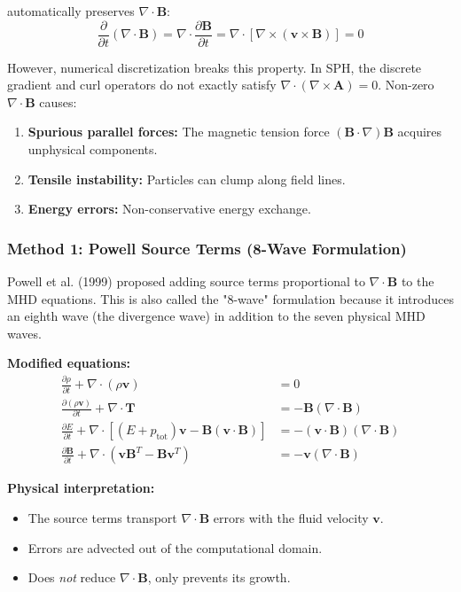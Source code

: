 \documentclass[12pt,a4paper]{article}
\begin{document}
automatically preserves $\nabla \cdot \bm{B}$:
\begin{equation}
\frac{\partial}{\partial t}(\nabla \cdot \bm{B}) = \nabla \cdot \frac{\partial \bm{B}}{\partial t}
= \nabla \cdot [\nabla \times (\bm{v} \times \bm{B})] = 0
\end{equation}

However, numerical discretization breaks this property. In SPH, the discrete
gradient and curl operators do not exactly satisfy $\nabla \cdot (\nabla \times \bm{A}) = 0$.
Non-zero $\nabla \cdot \bm{B}$ causes:
\begin{enumerate}
    \item \textbf{Spurious parallel forces:} The magnetic tension force
        $(\bm{B} \cdot \nabla)\bm{B}$ acquires unphysical components.
    \item \textbf{Tensile instability:} Particles can clump along field lines.
    \item \textbf{Energy errors:} Non-conservative energy exchange.
\end{enumerate}

\subsubsection{Method 1: Powell Source Terms (8-Wave Formulation)}

Powell et al. (1999) proposed adding source terms proportional to $\nabla \cdot \bm{B}$
to the MHD equations. This is also called the "8-wave" formulation because it
introduces an eighth wave (the divergence wave) in addition to the seven physical
MHD waves.

\textbf{Modified equations:}
\begin{align}
\frac{\partial \rho}{\partial t} + \nabla \cdot (\rho \bm{v}) &= 0 \\
\frac{\partial (\rho \bm{v})}{\partial t} + \nabla \cdot \bm{T} &= -\bm{B}(\nabla \cdot \bm{B})
\label{eq:powell_momentum_pde} \\
\frac{\partial E}{\partial t} + \nabla \cdot [(E + p_\text{tot})\bm{v} - \bm{B}(\bm{v} \cdot \bm{B})]
&= -(\bm{v} \cdot \bm{B})(\nabla \cdot \bm{B}) \label{eq:powell_energy_pde} \\
\frac{\partial \bm{B}}{\partial t} + \nabla \cdot (\bm{v}\bm{B}^T - \bm{B}\bm{v}^T)
&= -\bm{v}(\nabla \cdot \bm{B}) \label{eq:powell_induction_pde}
\end{align}

\textbf{Physical interpretation:}
\begin{itemize}
    \item The source terms transport $\nabla \cdot \bm{B}$ errors with the fluid velocity $\bm{v}$.
    \item Errors are advected out of the computational domain.
    \item Does \textit{not} reduce $\nabla \cdot \bm{B}$, only prevents its growth.
\end{itemize}
\end{document}
